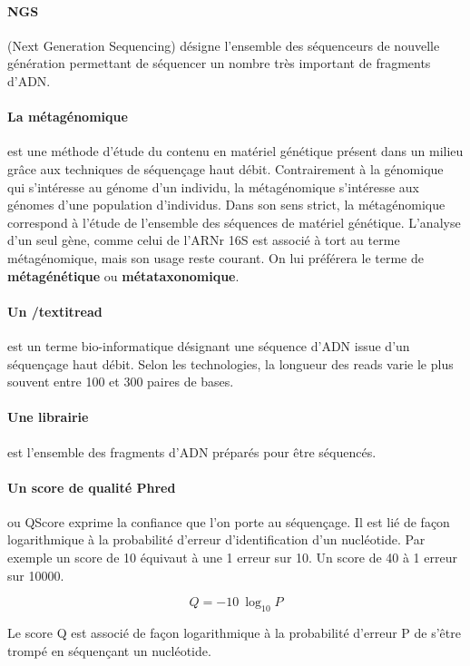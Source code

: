 \documentclass[12pt,a4paper]{article}
\begin{document}
\paragraph{NGS}(Next Generation Sequencing) désigne l'ensemble des séquenceurs de nouvelle génération permettant de séquencer un nombre très important de fragments d'ADN.

\paragraph{La métagénomique} est une méthode d’étude du contenu en matériel génétique présent dans un milieu grâce aux techniques de séquençage haut débit. Contrairement à la génomique qui s’intéresse au génome d’un individu, la métagénomique s’intéresse aux génomes d’une population d’individus.
Dans son sens strict, la métagénomique correspond à l’étude de l’ensemble des séquences de matériel génétique. L’analyse d’un seul gène, comme celui de l’ARNr 16S est associé à tort au terme métagénomique, mais son usage reste courant. On lui préférera le terme de \textbf{métagénétique} ou \textbf{métataxonomique}.

\paragraph{Un /textit{read}} est un terme bio-informatique désignant une séquence d’ADN issue d’un séquençage haut débit. Selon les technologies, la longueur des reads varie le plus souvent entre 100 et 300 paires de bases.

\paragraph{Une librairie} est l'ensemble des fragments d'ADN préparés pour être séquencés.

\paragraph{Un score de qualité Phred} ou QScore exprime la confiance que l'on porte au séquençage. Il est lié de façon logarithmique à la probabilité d'erreur d'identification d'un nucléotide.  Par exemple un score de 10 équivaut à une 1 erreur sur 10. Un score de 40 à 1 erreur sur 10000.


\begin{mycapequ}[!h]
   \begin{equation}
    Q = -10 \ \log_{10} P
   \end{equation}
      \caption{Le score Q est associé de façon logarithmique à la probabilité d'erreur P de s'être trompé en séquençant un nucléotide.}
\end{mycapequ}
\end{document}
